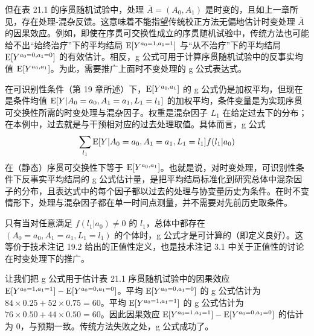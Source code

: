 但在表 21.1 的序贯随机试验中，处理 $\bar A=(A_0,A_1)$ 是时变的，且如上一章所见，存在处理-混杂反馈。这意味着不能指望传统校正方法无偏地估计时变处理 $\bar A$ 的因果效应。例如，即使在序贯可交换性成立的序贯随机试验中，传统方法也可能给不出“始终治疗”下的平均结局 $\mathrm{E}[Y^{a_0=1,a_1=1}]$ 与“从不治疗”下的平均结局 $\mathrm{E}[Y^{a_0=0,a_1=0}]$ 的有效估计。相反，g 公式可用于计算序贯随机试验中的反事实均值 $\mathrm{E}[Y^{a_0,a_1}]$。为此，需要推广上面时不变处理的 g 公式表达式。

在可识别性条件（第 19 章所述）下，$\mathrm{E}[Y^{a_0,a_1}]$ 的 g 公式仍是加权平均，但现在是条件均值 $\mathrm{E}[Y|A_0=a_0,A_1=a_1,L_1=l_1]$ 的加权平均，条件变量是为实现序贯可交换性所需的时变处理与混杂因子。权重是混杂因子 $L_1$ 在给定过去下的分布；在本例中，过去就是与干预相对应的过去处理取值。具体而言，g 公式
\[
\sum_{l_1}\mathrm{E}[Y|A_0=a_0,A_1=a_1,L_1=l_1]f(l_1|a_0)
\]
在（静态）序贯可交换性下等于 $\mathrm{E}[Y^{a_0,a_1}]$。也就是说，对时变处理，可识别性条件下反事实平均结局的 g 公式估计量，是把平均结局标准化到研究总体中混杂因子的分布，且表达式中的每个因子都以过去的处理与协变量历史为条件。在时不变情形下，处理与混杂因子都在单一时间点测量，并不需要对先前历史取条件。


只有当对任意满足 $f(l_1|a_0)\neq 0$ 的 $l_1$，总体中都存在 $(A_0=a_0,A_1=a_1,L_1=l_1)$ 的个体时，g 公式才是可计算的（即定义良好）。这等价于技术注记 19.2 给出的正值性定义，也是技术注记 3.1 中关于正值性的讨论在时变处理下的推广。

{\setlength{\emergencystretch}{1em}
让我们把 g 公式用于估计表 21.1 序贯随机试验中的因果效应 $\mathrm{E}[Y^{a_0=1,a_1=1}]-\mathrm{E}[Y^{a_0=0,a_1=0}]$。平均 $\mathrm{E}[Y^{a_0=0,a_1=0}]$ 的 g 公式估计为 $84\times0.25+52\times0.75=60$。平均 $\mathrm{E}[Y^{a_0=1,a_1=1}]$ 的 g 公式估计为 $76\times0.50+44\times0.50=60$。因此因果效应 $\mathrm{E}[Y^{a_0=1,a_1=1}]-\mathrm{E}[Y^{a_0=0,a_1=0}]$ 的估计为 0，与预期一致。传统方法失败之处，g 公式成功了。\par}


